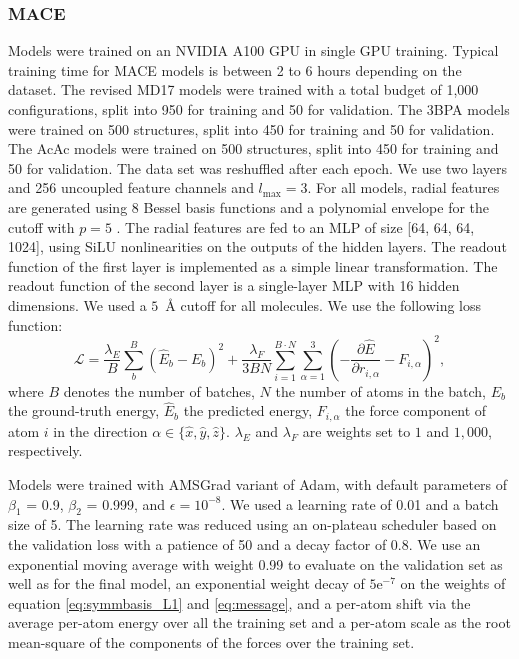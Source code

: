 \documentclass{article}
\begin{document}
\subsubsection{MACE}

Models were trained on an NVIDIA A100 GPU in single GPU training. Typical training time for MACE models is between 2 to 6 hours depending on the dataset.
The revised MD17 models were trained with a total budget of 1,000 configurations,
split into 950 for training and 50 for validation.
The 3BPA models were trained on 500 structures, split into 450 for training and 50 for validation.
The AcAc models were trained on 500 structures, split into 450 for training and 50 for validation.
The data set was reshuffled after each epoch.
We use two layers and 256  uncoupled feature channels and $l_\text{max} = 3$.
For all models, radial features are generated using 8 Bessel basis functions and a polynomial envelope for the cutoff with $p = 5$ \cite{DimeNet}.
The radial features are fed to an MLP of size [64, 64, 64, 1024],
using SiLU nonlinearities on the outputs of the hidden layers.
The readout function of the first layer is implemented as a simple linear transformation.
The readout function of the second layer is a single-layer MLP with 16 hidden dimensions.
We used a $5$~\AA{} cutoff for all molecules.
We use the following loss function:
%
\begin{equation}
  \label{eq:loss_fn}
  \mathcal{L} = \frac{\lambda_{E}}{B} \sum_{b}^{B} \left(\hat{E}_{b} - E_{b} \right)^{2}
  + \frac{\lambda_{F}}{3BN} \sum_{i=1}^{B \cdot N} \sum_{\alpha=1}^{3} 
  \left(- \frac{\partial \hat{E}}{\partial r_{i,\alpha}} - F_{i,\alpha} \right)^{2} ,
\end{equation}
%
where $B$ denotes the number of batches,
$N$ the number of atoms in the batch,
$E_{b}$ the ground-truth energy,
$\hat{E}_{b}$ the predicted energy,
$F_{i,\alpha}$ the force component of atom $i$ in the direction $\alpha \in \{\hat{x},\hat{y},\hat{z}\}$.
$\lambda_{E}$ and $\lambda_{F}$ are weights set to $1$ and $1,000$, respectively.

Models were trained with AMSGrad variant of Adam,
with default parameters of $\beta_{1}$ = 0.9, $\beta_{2}$ = 0.999, and $\epsilon = 10^{-8}$.
We used a learning rate of 0.01 and a batch size of 5.
The learning rate was reduced using an on-plateau scheduler based on the validation loss with a patience of 50 and a decay factor of 0.8.
We use
an exponential moving average with weight 0.99 to evaluate on the validation set as well as for the final model,
an exponential weight decay of $5\text{e}^{-7}$ on the weights of equation \ref{eq:symmbasis_L1} and \ref{eq:message},
and a per-atom shift via the average per-atom energy over all the training set and a per-atom scale as the root mean-square of the components of the forces over the training set.
\end{document}
